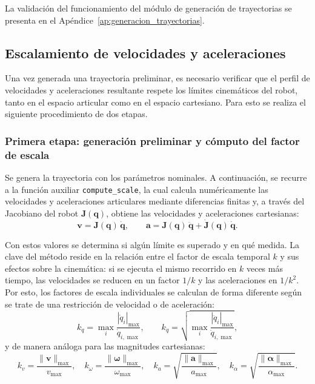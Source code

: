 \documentclass{article}
\begin{document}
La validación del funcionamiento del módulo de generación de trayectorias se presenta en el Apéndice~\ref{ap:generacion_trayectorias}.

%
%
\subsection{Escalamiento de velocidades y aceleraciones}
\label{sec:escalamiento_velocidades}

Una vez generada una trayectoria preliminar, es necesario verificar que el perfil de velocidades y aceleraciones resultante respete los límites cinemáticos del robot, tanto en el espacio articular como en el espacio cartesiano. Para esto se realiza el siguiente procedimiento de dos etapas.

\subsubsection*{Primera etapa: generación preliminar y cómputo del factor de escala}

Se genera la trayectoria con los parámetros nominales. A continuación, se recurre a la función auxiliar \colorbox{gray!20}{\texttt{compute\_scale}}, la cual calcula numéricamente las velocidades y aceleraciones articulares mediante diferencias finitas y, a través del Jacobiano del robot $\mathbf{J}(\mathbf{q})$, obtiene las velocidades y aceleraciones cartesianas:
\begin{equation}
    \mathbf{v} = \mathbf{J}(\mathbf{q})\,\dot{\mathbf{q}}, \qquad
    \mathbf{a} = \mathbf{J}(\mathbf{q})\,\ddot{\mathbf{q}} + \dot{\mathbf{J}}(\mathbf{q})\,\dot{\mathbf{q}}.
\end{equation}

Con estos valores se determina si algún límite es superado y en qué medida. La clave del método reside en la relación entre el factor de escala temporal $k$ y sus efectos sobre la cinemática: si se ejecuta el mismo recorrido en $k$ veces más tiempo, las velocidades se reducen en un factor $1/k$ y las aceleraciones en $1/k^2$. Por esto, los factores de escala individuales se calculan de forma diferente según se trate de una restricción de velocidad o de aceleración:
\begin{equation}
    k_{\dot{q}} = \max_{i}\frac{|\dot{q}_i|_{\max}}{\dot{q}_{i,\max}}, \qquad
    k_{\ddot{q}} = \sqrt{\max_{i}\frac{|\ddot{q}_i|_{\max}}{\ddot{q}_{i,\max}}},
\end{equation}
y de manera análoga para las magnitudes cartesianas:
\begin{equation}
    k_v = \frac{\|\mathbf{v}\|_{\max}}{v_{\max}}, \quad
    k_\omega = \frac{\|\boldsymbol{\omega}\|_{\max}}{\omega_{\max}}, \quad
    k_a = \sqrt{\frac{\|\mathbf{a}\|_{\max}}{a_{\max}}}, \quad
    k_\alpha = \sqrt{\frac{\|\boldsymbol{\alpha}\|_{\max}}{\alpha_{\max}}}.
\end{equation}
\end{document}
